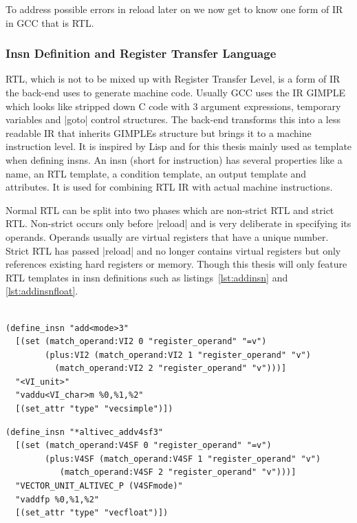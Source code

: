 {To address possible errors in reload later on we now get to know one form of \ac{IR} in \ac{GCC} that is \ac{RTL}.

\subsubsection{Insn Definition and Register Transfer Language}
\label{sec:defineinsn}
\acf{RTL}, which is not to be mixed up with Register Transfer Level, is a form of \ac{IR} the back-end uses to generate machine code.
Usually \ac{GCC} uses the \ac{IR} GIMPLE which looks like stripped down C code with 3 argument expressions, temporary variables and |goto| control structures.
The back-end transforms this into a less readable \ac{IR} that inherits GIMPLEs structure but brings it to a machine instruction level.
It is inspired by Lisp and for this thesis mainly used as template when defining insns.
An insn (short for instruction) has several properties like a name, an \ac{RTL} template, a condition template, an output template and attributes. \cite[ch.~16.2]{GCCint}
It is used for combining \ac{RTL} \ac{IR} with actual machine instructions.

Normal \ac{RTL} can be split into two phases which are non-strict \ac{RTL} and strict \ac{RTL}.
Non-strict occurs only before |reload| and is very deliberate in specifying its operands.
Operands usually are virtual registers that have a unique number.
Strict \ac{RTL} has passed |reload| and no longer contains virtual registers but only references existing hard registers or memory.
Though this thesis will only feature \ac{RTL} templates in insn definitions such as listings~\ref{lst:addinsn} and \ref{lst:addinsnfloat}.
\\
\\
\begin{lstlisting}[caption=Definition of Unspecific add Insn, label=lst:addinsn, float, floatplacement=htbp]
(define_insn "add<mode>3"
  [(set (match_operand:VI2 0 "register_operand" "=v")
        (plus:VI2 (match_operand:VI2 1 "register_operand" "v")
		  (match_operand:VI2 2 "register_operand" "v")))]
  "<VI_unit>"
  "vaddu<VI_char>m %0,%1,%2"
  [(set_attr "type" "vecsimple")])
\end{lstlisting}

\begin{lstlisting}[caption=Definition of Specific add Insn, label=lst:addinsnfloat, float, floatplacement=htbp]
(define_insn "*altivec_addv4sf3"
  [(set (match_operand:V4SF 0 "register_operand" "=v")
        (plus:V4SF (match_operand:V4SF 1 "register_operand" "v")
		   (match_operand:V4SF 2 "register_operand" "v")))]
  "VECTOR_UNIT_ALTIVEC_P (V4SFmode)"
  "vaddfp %0,%1,%2"
  [(set_attr "type" "vecfloat")])
\end{lstlisting}

}
